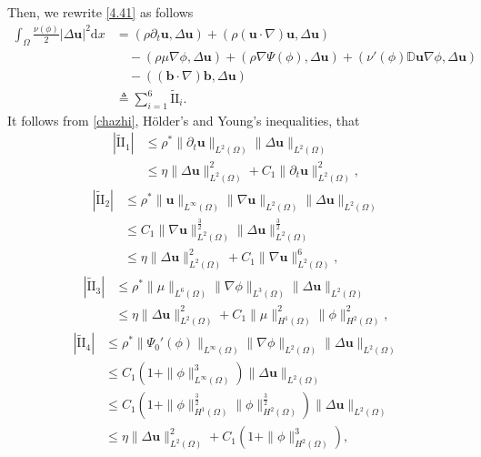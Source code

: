 \documentclass[11pt]{article}
\numberwithin{equation}{section}
\begin{document}
Then, we rewrite \eqref{4.41} as follows
\begin{equation}\label{4.43}
\begin{split}
\int_{\Omega}\frac{\nu(\phi)}{2}|\Delta\mathbf{u}|^2\mathrm{d}x
&=(\rho\partial_t\mathbf{u},\Delta\mathbf{u})
+(\rho(\mathbf{u}\cdot\nabla)\mathbf{u},\Delta
\mathbf{u}) \\
&\quad-(\rho\mu\nabla\phi,\Delta\mathbf{u})
+(\rho\nabla\Psi(\phi),\Delta\mathbf{u}) +(\nu'(\phi)\mathbb{D}\mathbf{u}\nabla\phi,\Delta\mathbf{u})
\\
&\quad -((\mathbf{b}\cdot\nabla)\mathbf{b},\Delta\mathbf{u})
\\&\triangleq\sum_{i=1}^{6} \tilde{\text{II}}_i.
\end{split}
\end{equation}
It follows from \eqref{chazhi}, H\"{o}lder's and Young's inequalities, that
\begin{equation*}\label{4.44}
\begin{split}
| \tilde{\text{II}}_1|&\leq \rho^*\|\partial_t\mathbf{u}\|_{L^2(\Omega)}\|\Delta\mathbf{u}\|_{L^2(\Omega)}
\\&\leq\eta
\|\Delta\mathbf{u}\|_{L^2(\Omega)}^2+C_1
\|\partial_t\mathbf{u}\|_{L^2(\Omega)}^2,
\end{split}
\end{equation*}
\begin{equation*}\label{4.45}
\begin{split}
| \tilde{\text{II}}_2|&\leq \rho^*\|\mathbf{u}\|_{L^{\infty}(\Omega)}\|\nabla\mathbf{u}\|_{L^2(\Omega)}
\|\Delta\mathbf{u}\|_{L^2(\Omega)} \\
&\leq C_1\|\nabla\mathbf{u}\|_{L^2(\Omega)}^{\frac{3}{2}}
\|\Delta\mathbf{u}\|_{L^2(\Omega)}^{\frac{3}{2}}\\
&\leq
\eta\|\Delta\mathbf{u}\|_{L^2(\Omega)}^2
+C_1\|\nabla\mathbf{u}\|_{L^2(\Omega)}^6,
\end{split}
\end{equation*}
\begin{equation*}\label{4.46}
\begin{split}
| \tilde{\text{II}}_3|&\leq \rho^*\|\mu\|_{L^6(\Omega)}\|\nabla\phi\|_{L^3(\Omega)}
\|\Delta\mathbf{u}\|_{L^2(\Omega)} \\
&\leq\eta\|\Delta\mathbf{u}\|_{L^2(\Omega)}^2
+C_1\|\mu\|_{H^1(\Omega)}^2\|\phi\|_{H^2(\Omega)}^2,
\end{split}
\end{equation*}
\begin{equation*}\label{4.47}
\begin{split}
| \tilde{\text{II}}_4|&\leq \rho^*\|\Psi_0'(\phi)\|_{L^{\infty}(\Omega)}
\|\nabla\phi\|_{L^2(\Omega)}\|\Delta\mathbf{u}\|_{L^2(\Omega)} \\
&\leq C_1(1 + \|\phi\|_{L^{\infty}(\Omega)}^3)\|\Delta\mathbf{u}\|_{L^2(\Omega)} \\
&\leq C_1(1 + \|\phi\|_{H^1(\Omega)}^{\frac{3}{2}}\|\phi\|_{H^2(\Omega)}^{\frac{3}{2}})
\|\Delta\mathbf{u}\|_{L^2(\Omega)} \\
&\leq \eta\|\Delta\mathbf{u}\|_{L^2(\Omega)}^2 + C_1(1 + \|\phi\|_{H^2(\Omega)}^3),
\end{split}
\end{equation*}
\end{document}
